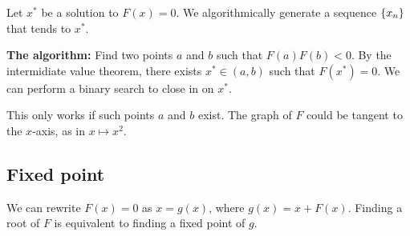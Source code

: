 Let $x^{*}$ be a solution to $F(x) = 0$.
We algorithmically generate a sequence $\set{x_{n}}$ that tends to $x^{*}$.

\textbf{The algorithm:} Find two points $a$ and $b$ such that $F(a) F(b) < 0$.
By the intermidiate value theorem, there exists $x^{*} \in (a, b)$ such that
$F(x^{*}) = 0$.
We can perform a binary search to close in on $x^{*}$.

\begin{remark}
    This only works if such points $a$ and $b$ exist.
    The graph of $F$ could be tangent to the $x$-axis, as in $x \mapsto x^{2}$.
\end{remark}

\subsection{Fixed point} \label{sec:fixed_point}
We can rewrite $F(x) = 0$ as $x = g(x)$, where $g(x) = x + F(x)$.
Finding a root of $F$ is equivalent to finding a fixed point of $g$.
